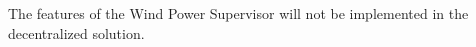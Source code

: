 The features of the Wind Power Supervisor will not be implemented in the decentralized solution.


%
%	
%
%

